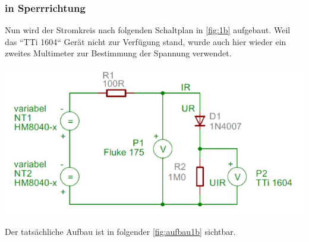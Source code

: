\documentclass[11pt,ngerman]{scrartcl}
\begin{document}
\newpage

\subsubsection{in Sperrrichtung}

Nun wird der Stromkreis nach folgenden Schaltplan in \autoref{fig:1b} aufgebaut. Weil das ``TTi 1604`` Gerät nicht zur Verfügung stand, wurde auch hier wieder ein zweites Multimeter zur Bestimmung der Spannung verwendet.

\begin{center}
	\begin{minipage}[t]{0.8\textwidth}
		\includegraphics[width=\textwidth]{skizze_1b}
		\label{fig:1b}
	\end{minipage}
\end{center}

\noindent Der tatsächliche Aufbau ist in folgender \autoref{fig:aufbau1b} sichtbar.
\end{document}
